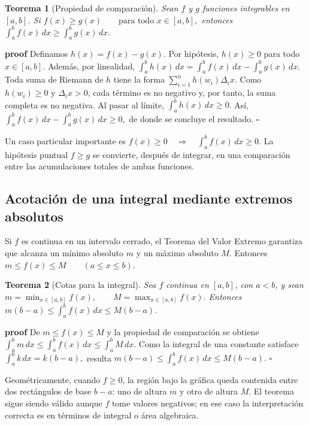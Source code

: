 \documentclass[12pt]{article}
\newtheorem{Teo}{Teorema}
\begin{document}
\begin{Teo}[Propiedad de comparación]
Sean $f$ y $g$ funciones integrables en $[a,b]$. Si
$
f(x)\ge g(x)\qquad\text{para todo }x\in[a,b],
$
entonces
$
\boxed{\int_a^b f(x)\,dx\ge \int_a^b g(x)\,dx.}
$
\end{Teo}

\textbf{proof}
Definamos
$
h(x)=f(x)-g(x).
$
Por hipótesis, $h(x)\ge0$ para todo $x\in[a,b]$. Además, por linealidad,
$
\int_a^b h(x)\,dx
=\int_a^b f(x)\,dx-\int_a^b g(x)\,dx.
$
Toda suma de Riemann de $h$ tiene la forma
$
\sum_{i=1}^n h(w_i)\Delta_i x.
$
Como $h(w_i)\ge0$ y $\Delta_i x>0$, cada término es no negativo y, por tanto,
la suma completa es no negativa. Al pasar al límite,
$
\int_a^b h(x)\,dx\ge0.
$
Así,
$
\int_a^b f(x)\,dx-\int_a^b g(x)\,dx\ge0,
$
de donde se concluye el resultado.
\hfill$\square$

Un caso particular importante es
$
f(x)\ge0\quad\Longrightarrow\quad \int_a^b f(x)\,dx\ge0.
$
La hipótesis puntual $f\ge g$ se convierte, después de integrar, en una
comparación entre las acumulaciones totales de ambas funciones.
\subsection*{Acotación de una integral mediante extremos absolutos}
Si $f$ es continua en un intervalo cerrado, el Teorema del Valor Extremo
garantiza que alcanza un mínimo absoluto $m$ y un máximo absoluto $M$.
Entonces
$
m\le f(x)\le M\qquad (a\le x\le b).
$

\begin{Teo}[Cotas para la integral]
Sea $f$ continua en $[a,b]$, con $a<b$, y sean
$
m=\min_{x\in[a,b]}f(x),
\qquad
M=\max_{x\in[a,b]}f(x).
$
Entonces
$
\boxed{
m(b-a)\le \int_a^b f(x)\,dx\le M(b-a).
}
$
\end{Teo}

\textbf{proof}
De
$
m\le f(x)\le M
$
y la propiedad de comparación se obtiene
$
\int_a^b m\,dx
\le
\int_a^b f(x)\,dx
\le
\int_a^b M\,dx.
$
Como la integral de una constante satisface
$
\int_a^b k\,dx=k(b-a),
$
resulta
$
m(b-a)\le \int_a^b f(x)\,dx\le M(b-a).
$
\hfill$\square$

Geométricamente, cuando $f\ge0$, la región bajo la gráfica queda contenida
entre dos rectángulos de base $b-a$: uno de altura $m$ y otro de altura $M$.
El teorema sigue siendo válido aunque $f$ tome valores negativos; en ese caso
la interpretación correcta es en términos de integral o área algebraica.
\end{document}
